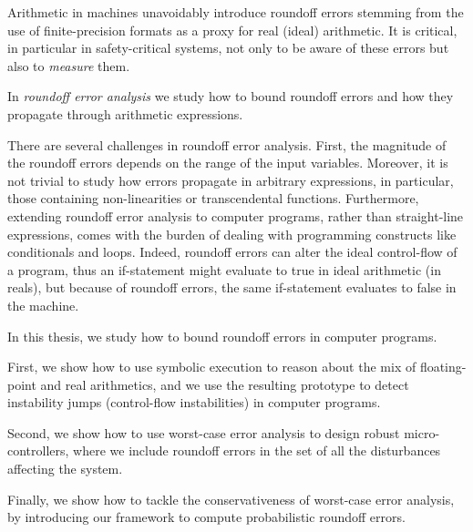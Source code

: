 %
Arithmetic in machines unavoidably introduce roundoff errors stemming from the use of finite-precision formats as a proxy for real (ideal) arithmetic. 
%
It is critical, in particular in safety-critical systems, not only to be aware of these errors but also to \emph{measure} them.
%

In \emph{roundoff error analysis} we study how to bound roundoff errors and how they propagate through arithmetic expressions.
%

There are several challenges in roundoff error analysis. 
%
First, the magnitude of the roundoff errors depends on the range of the input variables. 
%
Moreover, it is not trivial to study how errors propagate in arbitrary expressions, in particular, those containing non-linearities or transcendental functions.
%
Furthermore, extending roundoff error analysis to computer programs, rather than straight-line expressions, comes with the burden of dealing with programming constructs like conditionals and loops. 
%
Indeed, roundoff errors can alter the ideal control-flow of a program, thus an if-statement might evaluate to true in ideal arithmetic (in reals), but because of roundoff errors, the same if-statement evaluates to false in the machine. 
%
%
%
%
%

In this thesis, we study how to bound roundoff errors in computer programs.

First, we show how to use symbolic execution to reason about the mix of floating-point and real arithmetics, and we use the resulting prototype to detect instability jumps (control-flow instabilities) in computer programs.
%

Second, we show how to use worst-case error analysis to design robust micro-controllers, where we include roundoff errors in the set of all the disturbances affecting the system.
%

Finally, we show how to tackle the conservativeness of worst-case error analysis, by introducing our framework to compute probabilistic roundoff errors.